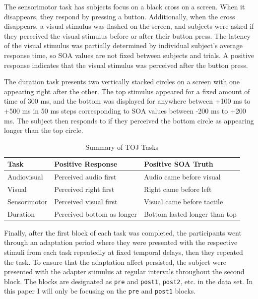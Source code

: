 \documentclass[11pt, oneside, openany]{scrbook}
\begin{document}
The sensorimotor task has subjects focus on a black cross on a screen. When it disappears, they respond by pressing a button. Additionally, when the cross disappears, a visual stimulus was flashed on the screen, and subjects were asked if they perceived the visual stimulus before or after their button press. The latency of the visual stimulus was partially determined by individual subject's average response time, so SOA values are not fixed between subjects and trials. A positive response indicates that the visual stimulus was perceived after the button press.

The duration task presents two vertically stacked circles on a screen with one appearing right after the other. The top stimulus appeared for a fixed amount of time of 300 ms, and the bottom was displayed for anywhere between +100 ms to +500 ms in 50 ms steps corresponding to SOA values between -200 ms to +200 ms. The subject then responds to if they perceived the bottom circle as appearing longer than the top circle.

\begin{table}[!h]

\caption{\label{tab:ch020-toj-summary}Summary of TOJ Tasks}
\centering
\begin{tabular}[t]{lll}
\toprule
Task & Positive Response & Positive SOA Truth\\
\midrule
Audiovisual & Perceived audio first & Audio came before visual\\
Visual & Perceived right first & Right came before left\\
Sensorimotor & Perceived visual first & Visual came before tactile\\
Duration & Perceived bottom as longer & Bottom lasted longer than top\\
\bottomrule
\end{tabular}
\end{table}

Finally, after the first block of each task was completed, the participants went through an adaptation period where they were presented with the respective stimuli from each task repeatedly at fixed temporal delays, then they repeated the task. To ensure that the adaptation affect persisted, the subject were presented with the adapter stimulus at regular intervals throughout the second block. The blocks are designated as \texttt{pre} and \texttt{post1}, \texttt{post2}, etc. in the data set. In this paper I will only be focusing on the \texttt{pre} and \texttt{post1} blocks.
\end{document}
